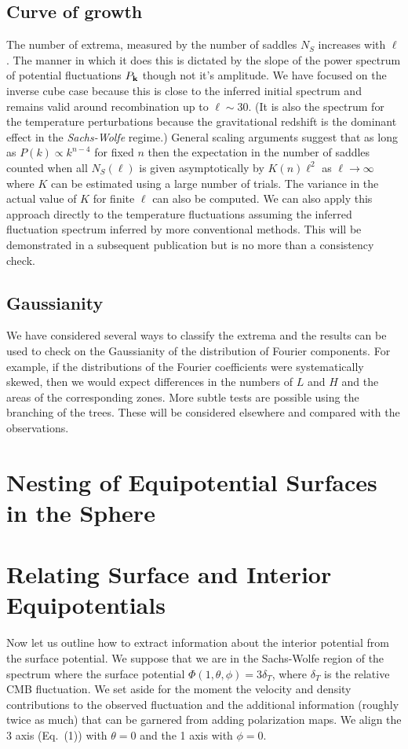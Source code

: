 \documentclass[12pt]{article}
\begin{document}
\subsection{Curve of growth}
The number of extrema, measured by the number of saddles $N_S$ increases with $\ell$. The manner in which it does this is dictated by the slope of the power spectrum of potential fluctuations $P_{\bf k}$ though not it's amplitude. We have focused on the inverse cube case because this is close to the inferred initial spectrum and remains valid around recombination up to $\ell\sim30$. (It is also the spectrum for the temperature perturbations because the gravitational redshift is the dominant effect in the \emph{Sachs-Wolfe} regime.) General scaling arguments suggest that as long as $P(k)\propto k^{n-4}$ for fixed $n$ then the expectation in the number of saddles counted when all $N_S(\ell)$ is given asymptotically by $K(n)\ell^2$ as $\ell\rightarrow\infty$ where $K$ can be estimated using a large number of  trials. The variance in the actual value of $K$ for finite $\ell$ can also be computed. We can also apply this approach directly to the temperature fluctuations assuming the inferred fluctuation spectrum inferred by more conventional methods. This will be demonstrated in a subsequent publication but is no more than a consistency check.

\subsection{Gaussianity}
We have considered several ways to classify the extrema and the results can be used to check on the Gaussianity of the distribution of Fourier components. For example, if the distributions of the Fourier coefficients were systematically skewed, then we would expect differences in the numbers of $L$ and $H$ and the areas of the corresponding zones. More subtle tests are possible using the branching of the trees. These will be considered elsewhere and compared with the observations.

\section{Nesting of Equipotential Surfaces in the Sphere}

\section{Relating Surface and Interior Equipotentials}
Now let us outline how to extract information about the interior potential from the surface potential. We suppose that we are in the Sachs-Wolfe region of the spectrum where the surface potential $\Phi(1,\theta,\phi)=3\delta_T$, where $\delta_T$ is the relative CMB fluctuation. We set aside for the moment the velocity and density contributions to the observed fluctuation and the additional information (roughly twice as much) that can be garnered from adding  polarization maps. We align the 3 axis (Eq.~(1)) with $\theta=0$ and the 1 axis with $\phi=0$.
\end{document}
